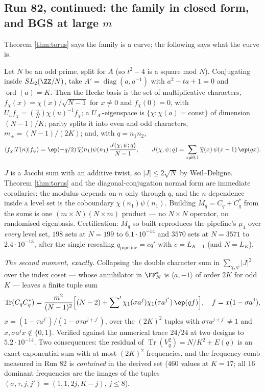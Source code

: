 \subsection{Run 82, continued: the family in closed form, and BGS at large
\texorpdfstring{$m$}{m}}\label{sub:r82b}

Theorem \ref{thm:torus} says the family is a curve; the following says what the
curve is.

\begin{theorem}\label{thm:jacobi}
Let $N$ be an odd prime, split for $A$ (so $t^2-4$ is a square mod $N$).
Conjugating inside $SL_2(\ZZ/N)$, take $A'=\operatorname{diag}(a,a^{-1})$ with
$a^2-ta+1=0$ and $\operatorname{ord}(a)=K$.  Then the Hecke basis is the set of
multiplicative characters, $f_\chi(x)=\chi(x)/\sqrt{N-1}$ for $x\neq0$ and
$f_\chi(0)=0$, with $U_uf_\chi=\left(\tfrac uN\right)\chi(u)^{-1}f_\chi$; a
$U_{A'}$-eigenspace is $\{\chi:\chi(a)=\text{const}\}$ of dimension $(N-1)/K$;
parity splits it into even and odd characters, $m_\pm=(N-1)/(2K)$; and, with
$q=n_1n_2$,
\[
  \langle f_\chi|T(n)|f_\psi\rangle
  =\ep(-q/2)\,\overline{\chi}(n_1)\psi(n_1)\,
   \frac{J(\chi,\psi;q)}{N-1},
  \qquad
  J(\chi,\psi;q)=\sum_{x\neq0,1}\overline{\chi}(x)\,\psi(x-1)\,\ep(qx).
\]
\end{theorem}

$J$ is a Jacobi sum with an additive twist, so $|J|\le2\sqrt N$ by
Weil--Deligne.  Theorem \ref{thm:torus} and the diagonal-conjugation normal form
are immediate corollaries: the modulus depends on $n$ only through $q$, and the
$n$-dependence inside a level set is the coboundary
$\overline{\chi}(n_1)\psi(n_1)$.  Building $M_q=C_q+C_q^{*}$ from the sums is one
$(m\times N)(N\times m)$ product --- no $N\times N$ operator, no randomised
eigenbasis.  Certification: $M_q$ so built reproduces the pipeline's $\mu_4$ over
\emph{every} level set, $198$ sets at $N=199$ to $6.1\cdot10^{-14}$ and $3570$
sets at $N=3571$ to $2.4\cdot10^{-13}$, after the single rescaling
$q_{\mathrm{pipeline}}=cq'$ with $c=L_{K-1}$ (and $N=L_K$).

\emph{The second moment, exactly.}  Collapsing the double character sum in
$\sum_{\chi,\psi}|J|^2$ over the index coset --- whose annihilator in $\FF_N^*$
is $\langle a,-1\rangle$ of order $2K$ for odd $K$ --- leaves a finite tuple sum
\[
  \operatorname{Tr}(C_qC_q^{*})
  =\frac{m^2}{(N-1)^2}\Bigl[(N-2)
    +\sum\nolimits'\chi_1(\sigma a^j)\chi_1(\tau a^{j'})\,\ep(qf)\Bigr],
  \quad f=x(1-\sigma a^j),
\]
$x=(1-\tau a^{j'})/(1-\sigma\tau a^{j+j'})$, over the $(2K)^2$ tuples with
$\sigma\tau a^{j+j'}\neq1$ and $x,\sigma a^jx\notin\{0,1\}$.  Verified against
the numerical trace $24/24$ at two designs to $5.2\cdot10^{-14}$.  Two
consequences: the residual of $\operatorname{Tr}(V_q^2)=N/K^2+E(q)$ is an exact
exponential sum with at most $(2K)^2$ frequencies, and the frequency comb
measured in Run 82 is \emph{contained} in the derived set ($460$ values at
$K=17$; all $16$ dominant frequencies are the images of the tuples
$(\sigma,\tau,j,j')=(1,1,2j,K-j)$, $j\le8$).

